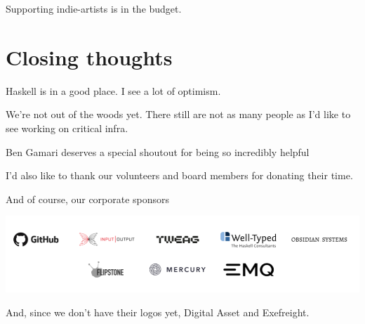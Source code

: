 \documentclass[tikz]{beamer}
\theoremstyle{definition}
\begin{document}
\frame
{ 
	Supporting indie-artists is in the budget. 
} 

\section{Closing thoughts}

\frame
{ 
	Haskell is in a good place. I see a lot of optimism. 

}

\frame
{ 
	We're not out of the woods yet. There still are not as many people as I'd like to see working on critical infra. 
} 

\frame
{ 
	Ben Gamari deserves a special shoutout for being so incredibly helpful 
} 

\frame
{ 
	I'd also like to thank our volunteers and board members for donating their time. 
} 

\frame
{ 
	And of course, our corporate sponsors
} 

\frame
{ 
	\begin{center}
	\includegraphics[scale=0.3]{sponsors.png}
	\end{center}
} 

\frame
{ 
	And, since we don't have their logos yet, Digital Asset and Exefreight.
} 
\end{document}
